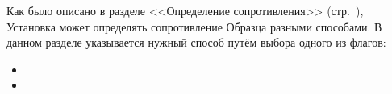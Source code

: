 \label{sec_r_measure_config}

Как было описано в разделе <<Определение сопротивления>> (стр.~\pageref{sec_r_measures}), Установка может определять сопротивление Образца разными способами. В данном разделе указывается нужный способ путём выбора одного из флагов:

\begin{itemize}
\item {}
\item {}
\end{itemize}

